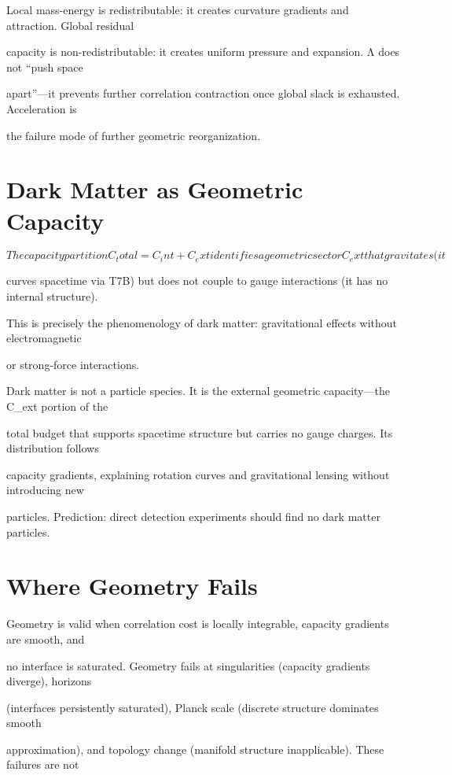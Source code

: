 \documentclass[11pt]{article}
\begin{document}
Local mass-energy is redistributable: it creates curvature gradients and attraction. Global residual

capacity is non-redistributable: it creates uniform pressure and expansion. Λ does not “push space

apart”---it prevents further correlation contraction once global slack is exhausted. Acceleration is

the failure mode of further geometric reorganization.



\section{Dark Matter as Geometric Capacity}

\[The capacity partition C_total = C_int + C_ext identifies a geometric sector C_ext that gravitates (it\]

curves spacetime via T7B) but does not couple to gauge interactions (it has no internal structure).

This is precisely the phenomenology of dark matter: gravitational effects without electromagnetic

or strong-force interactions.



Dark matter is not a particle species. It is the external geometric capacity---the C_ext portion of the

total budget that supports spacetime structure but carries no gauge charges. Its distribution follows

capacity gradients, explaining rotation curves and gravitational lensing without introducing new

particles. Prediction: direct detection experiments should find no dark matter particles.



\section{Where Geometry Fails}

Geometry is valid when correlation cost is locally integrable, capacity gradients are smooth, and

no interface is saturated. Geometry fails at singularities (capacity gradients diverge), horizons

(interfaces persistently saturated), Planck scale (discrete structure dominates smooth

approximation), and topology change (manifold structure inapplicable). These failures are not
\end{document}
